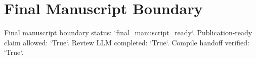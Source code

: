 \section{Final Manuscript Boundary}
Final manuscript boundary status: `final\_manuscript\_ready`. Publication-ready claim allowed: `True`. Review LLM completed: `True`. Compile handoff verified: `True`.
